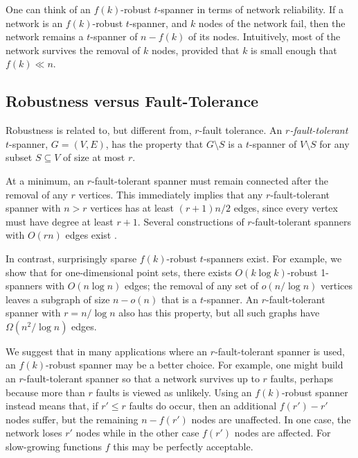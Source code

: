 \documentclass{cccg12}
\begin{document}
One can think of an $f(k)$-robust $t$-spanner in terms of network
reliability.  If a network is an $f(k)$-robust $t$-spanner, and $k$ nodes
of the network fail, then the network remains a $t$-spanner of $n-f(k)$
of its nodes.  Intuitively, most of the network survives the removal of
$k$ nodes, provided that $k$ is small enough that $f(k)\ll n$.

\subsection{Robustness versus Fault-Tolerance}

Robustness is related to, but different from, $r$-fault tolerance.
An \emph{$r$-fault-tolerant} $t$-spanner, $G=(V,E)$, has the property
that $G\setminus S$ is a $t$-spanner of $V\setminus S$ for any subset
$S\subseteq V$ of size at most $r$. 

At a minimum, an $r$-fault-tolerant spanner must remain connected
after the removal of any $r$ vertices.  This immediately implies
that any $r$-fault-tolerant spanner with $n>r$ vertices has at least
$(r+1)n/2$ edges, since every vertex must have degree at least $r+1$.
Several constructions of $r$-fault-tolerant spanners with $O(rn)$ edges
exist \cite{cz04,lns02,l99}.

In contrast, surprisingly sparse $f(k)$-robust $t$-spanners exist.
For example, we show that for one-dimensional point sets, there exists
$O(k\log k)$-robust 1-spanners with $O(n\log n)$ edges; the removal of
any set of $o(n/\log n)$ vertices leaves a subgraph of size $n-o(n)$ that
is a $t$-spanner.  An $r$-fault-tolerant spanner with $r=n/\log n$ also
has this property, but all such graphs have $\Omega(n^2/\log n)$ edges.

We suggest that in many applications where an $r$-fault-tolerant spanner
is used, an $f(k)$-robust spanner may be a better choice.  For example,
one might build an $r$-fault-tolerant spanner so that a network survives
up to $r$ faults, perhaps because more than $r$ faults is viewed as
unlikely.  Using an $f(k)$-robust spanner instead means that, if $r'\le
r$ faults do occur, then an additional $f(r')-r'$ nodes suffer, but the
remaining $n-f(r')$ nodes are unaffected.  In one case, the network
loses $r'$ nodes while in the other case $f(r')$ nodes are affected.
For slow-growing functions $f$ this may be perfectly acceptable.
\end{document}
